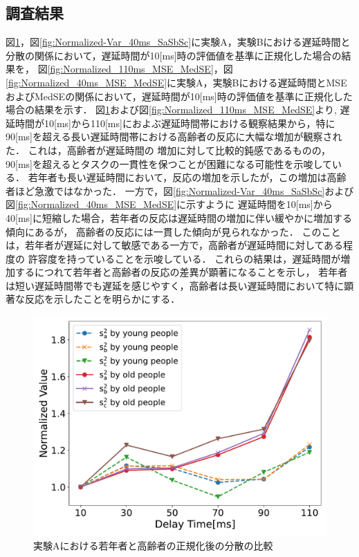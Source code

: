 \subsection{調査結果}
図\ref{fig:Normalized-Var_110ms_SaSbSc}，図\ref{fig:Normalized-Var_40ms_SaSbSc}に実験A，実験Bにおける遅延時間と分散の関係において，遅延時間が10[ms]時の評価値を基準に正規化した場合の結果を，
図\ref{fig:Normalized_110ms_MSE_MedSE}，図\ref{fig:Normalized_40ms_MSE_MedSE}に実験A，実験Bにおける遅延時間とMSEおよびMedSEの関係において，遅延時間が10[ms]時の評価値を基準に正規化した場合の結果を示す．
図\ref{fig:Normalized-Var_110ms_SaSbSc}および図\ref{fig:Normalized_110ms_MSE_MedSE}より,
遅延時間が10[ms]から110[ms]におよぶ遅延時間帯における観察結果から，特に90[ms]を超える長い遅延時間帯における高齢者の反応に大幅な増加が観察された．
これは，高齢者が遅延時間の
増加に対して比較的鈍感であるものの，90[ms]を超えるとタスクの一貫性を保つことが困難になる可能性を示唆している．
若年者も長い遅延時間において，反応の増加を示したが，この増加は高齢者ほど急激ではなかった．
一方で，図\ref{fig:Normalized-Var_40ms_SaSbSc}および図\ref{fig:Normalized_40ms_MSE_MedSE}に示すように
遅延時間を10[ms]から40[ms]に短縮した場合，若年者の反応は遅延時間の増加に伴い緩やかに増加する傾向にあるが，
高齢者の反応には一貫した傾向が見られなかった．
このことは，若年者が遅延に対して敏感である一方で，高齢者が遅延時間に対してある程度の
許容度を持っていることを示唆している．
これらの結果は，遅延時間が増加するにつれて若年者と高齢者の反応の差異が顕著になることを示し，
若年者は短い遅延時間帯でも遅延を感じやすく，高齢者は長い遅延時間において特に顕著な反応を示したことを明らかにする．
\begin{figure}[tbp]
  \centering
  \includegraphics[scale=0.3]{figures/Honbann/Comparison_young_old/110_var_normalized.pdf}
  \caption{実験Aにおける若年者と高齢者の正規化後の分散の比較}
  \label{fig:Normalized-Var_110ms_SaSbSc}
\end{figure}
